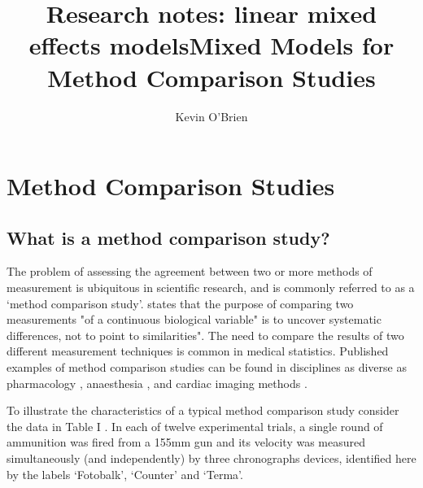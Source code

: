 \documentclass[12pt, a4paper]{report}
\title{Research notes: linear mixed effects models}
\author{ } \date{ }
\theoremstyle{plain}
\theoremstyle{definition}
\theoremstyle{remark}
\begin{document}
	\author{Kevin O'Brien}
	\title{Mixed Models for Method Comparison Studies}
	\tableofcontents
	
	\newpage
	\chapter{Method Comparison Studies}

	\section{What is a method comparison study?}
	
	
	The problem of assessing the agreement between two or more methods
	of measurement is ubiquitous in scientific research, and is
	commonly referred to as a `method comparison study'. \citet{ludbrook97} states that the purpose of comparing two measurements "of a continuous biological variable" is to uncover systematic differences, not to point to similarities". The need to compare the results of two different measurement techniques is common in medical statistics. Published
	examples of method comparison studies can be found in disciplines
	as diverse as pharmacology \citep{ludbrook97}, anaesthesia
	\citep{Myles}, and cardiac imaging methods \citep{Krumm}.
	\smallskip
	
	To illustrate the characteristics of a typical method comparison
	study consider the data in Table I \citep{Grubbs73}. In each of
	twelve experimental trials, a single round of ammunition was fired
	from a 155mm gun and its velocity was measured simultaneously (and
	independently) by three chronographs devices, identified here by
	the labels `Fotobalk', `Counter' and `Terma'.
	\smallskip
		
\end{document}
